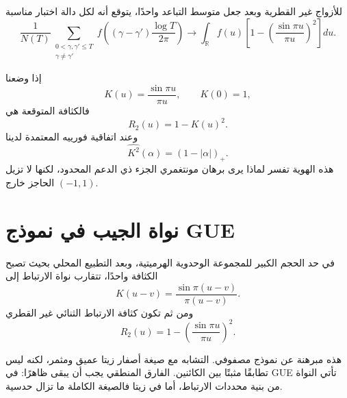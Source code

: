 \begin{conjecture}
\label{conj:ch23-pair-correlation}
للأزواج غير القطرية وبعد جعل متوسط التباعد واحدًا، يتوقع أنه لكل دالة اختبار مناسبة
\[
\frac{1}{N(T)}
\sum_{\substack{0<\gamma,\gamma'\le T\\ \gamma\ne\gamma'}}
f\!\left((\gamma-\gamma')\frac{\log T}{2\pi}\right)
\longrightarrow
\int_{\mathbb R}f(u)
\left[1-\left(\frac{\sin\pi u}{\pi u}\right)^2\right]du.
\]
\end{conjecture}

إذا وضعنا
\[
K(u)=\frac{\sin\pi u}{\pi u},
\qquad K(0)=1,
\]
فالكثافة المتوقعة هي
\[
R_2(u)=1-K(u)^2.
\]
وعند اتفاقية فورييه المعتمدة لدينا
\[
\widehat{K^2}(\alpha)=(1-|\alpha|)_+.
\]
هذه الهوية تفسر لماذا يرى برهان مونتغمري الجزء ذي الدعم المحدود، لكنها لا تزيل الحاجز خارج \((-1,1)\).

\section{نواة الجيب في نموذج GUE}

\begin{theorem}
\label{thm:ch23-gue-sine-kernel}
في حد الحجم الكبير للمجموعة الوحدوية الهرميتية، وبعد التطبيع المحلي بحيث تصبح الكثافة واحدًا، تتقارب نواة الارتباط إلى
\[
K(u-v)=\frac{\sin\pi(u-v)}{\pi(u-v)}.
\]
ومن ثم تكون كثافة الارتباط الثنائي غير القطري
\[
R_2(u)=1-\left(\frac{\sin\pi u}{\pi u}\right)^2.
\]
\end{theorem}

هذه مبرهنة عن نموذج مصفوفي. التشابه مع صيغة أصفار زيتا عميق ومثمر، لكنه ليس تطابقًا مثبتًا بين الكائنين. الفارق المنطقي يجب أن يبقى ظاهرًا: في GUE تأتي النواة من بنية محددات الارتباط، أما في زيتا فالصيغة الكاملة ما تزال حدسية.

\begin{antfigure}
\caption{كثافة الارتباط الثنائي غير القطري
\(R_2(u)=1-\bigl(\sin\pi u/\pi u\bigr)^2\) لنموذج \textenglish{GUE} كما في
المبرهنة أعلاه، مرسومة مباشرة من الصيغة المغلقة (لا بيانات تقريبية). القيمة
تنعدم عند \(u=0\) (التنافر المحلي بين الأصفار المتجاورة) وتؤول إلى \(1\)
لِـ\(u\) الكبير (الخط الأفقي المتقطع).}
\label{fig:gue-pair-correlation}
\end{antfigure}

